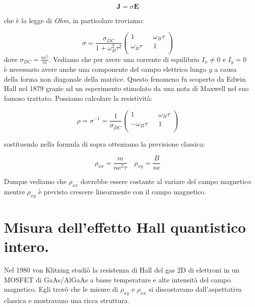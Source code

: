 \documentclass[12pt,a4paper]{article}
\begin{document}
\begin{equation}
\mathbf{J} = \sigma \mathbf{E}
\end{equation}

che è la legge di \emph{Ohm}, in particolare troviamo: 

\begin{equation}
\sigma = 
\frac{\sigma_{DC}}{1 + \omega_B^2 \tau^2} 
\left(
\begin{matrix} 
1 && \omega_B \tau \\
\omega_B \tau && 1\\
\end{matrix} \right)
\end{equation}
dove $\sigma_{DC} = \frac{n e^2}{m}$. Vediamo che per avere una corrente di equilibrio $I_x \neq 0$ e $ I_y = 0$ è necessario avere anche una componente del campo elettrico lungo $y$ a causa della forma non diagonale della matrice. Questo fenomeno fu scoperto da Edwin Hall nel 1879 grazie ad un esperimento stimolato da una nota di Maxwell nel suo famoso trattato. Possiamo calcolare la resistività:

\begin{equation}
\rho = \sigma ^{-1} = \frac{1}{\sigma_{DC}}
\left(
\begin{matrix}
1 && \omega_B \tau \\
- \omega_B \tau && 1 \\
\end{matrix}
\right)
\end{equation}

sostituendo nella formula di sopra otteniamo la previsione classica:

\begin{equation}
\rho_{xx} = \frac{m}{n e^2 \tau}  \quad \rho_{xy} = \frac{B}{ne}
\end{equation}

Dunque vediamo che $\rho_{xx}$ dovrebbe essere costante al variare del campo magnetico mentre $\rho_{xy}$ è previsto crescere linearmente con il campo magnetico.

 
\section{Misura dell'effetto Hall quantistico intero.}

Nel 1980 von Klitzing studiò la resistenza di Hall del gas 2D di elettroni in un MOSFET di GaAs/AlGaAs a basse temperature e alte intensità del campo magnetico. Egli trovò che le misure  di $\rho_{xy}$ e $\rho_{xx}$ si discostavano dall'aspettativa classica e mostravano una ricca struttura.
\end{document}
